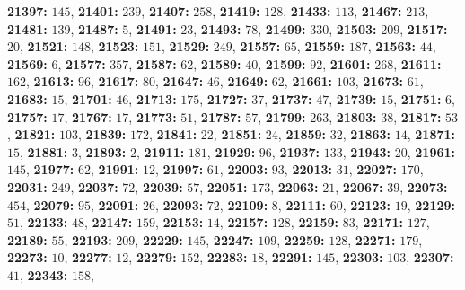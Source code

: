 \textsf{\bfseries 21397:} $145$, \textsf{\bfseries 21401:} $239$, \textsf{\bfseries 21407:} $258$, \textsf{\bfseries 21419:} $128$, \textsf{\bfseries 21433:} $113$, \textsf{\bfseries 21467:} $213$, \textsf{\bfseries 21481:} $139$, \textsf{\bfseries 21487:} $5$, \textsf{\bfseries 21491:} $23$, \textsf{\bfseries 21493:} $78$, \textsf{\bfseries 21499:} $330$, \textsf{\bfseries 21503:} $209$, \textsf{\bfseries 21517:} $20$, \textsf{\bfseries 21521:} $148$, \textsf{\bfseries 21523:} $151$, \textsf{\bfseries 21529:} $249$, \textsf{\bfseries 21557:} $65$, \textsf{\bfseries 21559:} $187$, \textsf{\bfseries 21563:} $44$, \textsf{\bfseries 21569:} $6$, \textsf{\bfseries 21577:} $357$, \textsf{\bfseries 21587:} $62$, \textsf{\bfseries 21589:} $40$, \textsf{\bfseries 21599:} $92$, \textsf{\bfseries 21601:} $268$, \textsf{\bfseries 21611:} $162$, \textsf{\bfseries 21613:} $96$, \textsf{\bfseries 21617:} $80$, \textsf{\bfseries 21647:} $46$, \textsf{\bfseries 21649:} $62$, \textsf{\bfseries 21661:} $103$, \textsf{\bfseries 21673:} $61$, \textsf{\bfseries 21683:} $15$, \textsf{\bfseries 21701:} $46$, \textsf{\bfseries 21713:} $175$, \textsf{\bfseries 21727:} $37$, \textsf{\bfseries 21737:} $47$, \textsf{\bfseries 21739:} $15$, \textsf{\bfseries 21751:} $6$, \textsf{\bfseries 21757:} $17$, \textsf{\bfseries 21767:} $17$, \textsf{\bfseries 21773:} $51$, \textsf{\bfseries 21787:} $57$, \textsf{\bfseries 21799:} $263$, \textsf{\bfseries 21803:} $38$, \textsf{\bfseries 21817:} $53$, \textsf{\bfseries 21821:} $103$, \textsf{\bfseries 21839:} $172$, \textsf{\bfseries 21841:} $22$, \textsf{\bfseries 21851:} $24$, \textsf{\bfseries 21859:} $32$, \textsf{\bfseries 21863:} $14$, \textsf{\bfseries 21871:} $15$, \textsf{\bfseries 21881:} $3$, \textsf{\bfseries 21893:} $2$, \textsf{\bfseries 21911:} $181$, \textsf{\bfseries 21929:} $96$, \textsf{\bfseries 21937:} $133$, \textsf{\bfseries 21943:} $20$, \textsf{\bfseries 21961:} $145$, \textsf{\bfseries 21977:} $62$, \textsf{\bfseries 21991:} $12$, \textsf{\bfseries 21997:} $61$, \textsf{\bfseries 22003:} $93$, \textsf{\bfseries 22013:} $31$, \textsf{\bfseries 22027:} $170$, \textsf{\bfseries 22031:} $249$, \textsf{\bfseries 22037:} $72$, \textsf{\bfseries 22039:} $57$, \textsf{\bfseries 22051:} $173$, \textsf{\bfseries 22063:} $21$, \textsf{\bfseries 22067:} $39$, \textsf{\bfseries 22073:} $454$, \textsf{\bfseries 22079:} $95$, \textsf{\bfseries 22091:} $26$, \textsf{\bfseries 22093:} $72$, \textsf{\bfseries 22109:} $8$, \textsf{\bfseries 22111:} $60$, \textsf{\bfseries 22123:} $19$, \textsf{\bfseries 22129:} $51$, \textsf{\bfseries 22133:} $48$, \textsf{\bfseries 22147:} $159$, \textsf{\bfseries 22153:} $14$, \textsf{\bfseries 22157:} $128$, \textsf{\bfseries 22159:} $83$, \textsf{\bfseries 22171:} $127$, \textsf{\bfseries 22189:} $55$, \textsf{\bfseries 22193:} $209$, \textsf{\bfseries 22229:} $145$, \textsf{\bfseries 22247:} $109$, \textsf{\bfseries 22259:} $128$, \textsf{\bfseries 22271:} $179$, \textsf{\bfseries 22273:} $10$, \textsf{\bfseries 22277:} $12$, \textsf{\bfseries 22279:} $152$, \textsf{\bfseries 22283:} $18$, \textsf{\bfseries 22291:} $145$, \textsf{\bfseries 22303:} $103$, \textsf{\bfseries 22307:} $41$, \textsf{\bfseries 22343:} $158$, 
